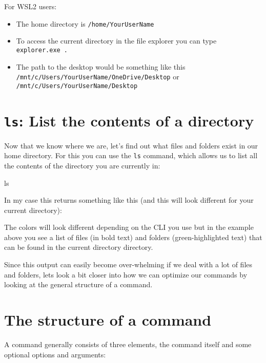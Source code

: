 \documentclass[
  letterpaper,
  DIV=11,
  numbers=noendperiod]{scrreprt}
\newenvironment{Shaded}{}{}
\newcommand{\FunctionTok}[1]{\textcolor[rgb]{0.44,0.26,0.76}{#1}}
\providecommand{\tightlist}{%
  \setlength{\itemsep}{0pt}\setlength{\parskip}{0pt}}\usepackage{longtable,booktabs,array}
\begin{document}
\begin{tcolorbox}
For WSL2 users:

\begin{itemize}
\tightlist
\item
  The home directory is \texttt{/home/YourUserName}
\item
  To access the current directory in the file explorer you can type
  \texttt{explorer.exe\ .}
\item
  The path to the desktop would be something like this
  \texttt{/mnt/c/Users/YourUserName/OneDrive/Desktop} or
  \texttt{/mnt/c/Users/YourUserName/Desktop}
\end{itemize}

\end{tcolorbox}

\section{\texorpdfstring{\texttt{ls}: List the contents of a
directory}{ls: List the contents of a directory}}\label{ls-list-the-contents-of-a-directory}

Now that we know where we are, let's find out what files and folders
exist in our home directory. For this you can use the \texttt{ls}
command, which allows us to list all the contents of the directory you
are currently in:

\begin{Shaded}
\begin{Highlighting}[]
\FunctionTok{ls}
\end{Highlighting}
\end{Shaded}

In my case this returns something like this (and this will look
different for your current directory):

The colors will look different depending on the CLI you use but in the
example above you see a list of files (in bold text) and folders
(green-highlighted text) that can be found in the current directory
directory.

Since this output can easily become over-whelming if we deal with a lot
of files and folders, lets look a bit closer into how we can optimize
our commands by looking at the general structure of a command.

\section{The structure of a command}\label{the-structure-of-a-command}

A command generally consists of three elements, the command itself and
some optional options and arguments:
\end{document}
